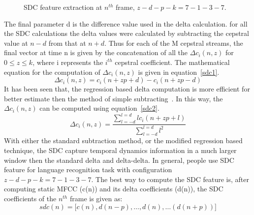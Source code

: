 \begin{spacing}{1.5}
\begin{figure}[h]
\caption{SDC feature extraction at $n^{th}$ frame, $z-d-p-k=7-1-3-7$.}
\label{sdc}
\end{figure} 
The final parameter d is the difference value used in the delta calculation. for all the SDC calculations the delta values were calculated by subtracting the cepstral value at $n-d$ from that at $n+d$. Thus for each of the M cepstral streams, the final vector at time n is given by the concatenation of all the $\Delta c_{i}(n,z)$ for $0 \leq z \leq k$, where i represents the $i^{th}$ cepstral coefficient. The mathematical equation for the computation of $\Delta c_{i}(n,z)$ is given in equation~\ref{sdc1}.
\begin{equation}
    \label{sdc1}
    \Delta c_{i}(n,z)= c_{i}(n+zp+d)-c_{i}(n+zp-d)
\end{equation}
It has been seen that, the regression based delta computation is more efficient for better estimate then the method of simple subtracting~\cite{ambikairajah2011language}. In this way, the $\Delta c_{i}(n,z)$ can be computed using equation~\ref{sdc2}. 
\begin{equation}
\label{sdc2}
    \Delta c_{i}(n,z)=\frac{\sum _{l=-d}^{l=d}l c_{i}(n+zp+l)}{\sum _{l=-d}^{l=d} l^2}
\end{equation}
With either the standard subtraction method, or the modified regression based technique, the SDC capture temporal dynamics information in a much larger window then the standard delta and delta-delta. In general, people use SDC feature for language recognition task with configuration $z-d-p-k=7-1-3-7$. The best way to compute the SDC feature is, after computing static MFCC (c(n)) and its delta coefficients (d(n)), the SDC coefficients of the $n^{th}$ frame is given as: $$sdc(n)=\Big[c(n), d(n-p),\ldots,d(n),\ldots(d(n+p)) \Big ] $$ 


\end{spacing}
